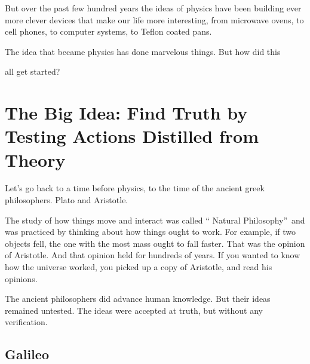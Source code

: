 \documentclass{article}
\begin{document}
But over the past few hundred years the ideas of physics have been building
ever more clever devices that make our life more interesting, from microwave
ovens, to cell phones, to computer systems, to Teflon coated pans.


The idea that became physics has done marvelous things. But how did this

all get started?

\section{The Big Idea: Find Truth by Testing Actions Distilled from Theory}

Let's go back to a time before physics, to the time of the ancient greek
philosophers. Plato and Aristotle.

The study of how things move and interact was called \textquotedblleft
Natural Philosophy\textquotedblright\ and was practiced by thinking about
how things ought to work. For example, if two objects fell, the one with the
most mass ought to fall faster. That was the opinion of Aristotle. And that
opinion held for hundreds of years. If you wanted to know how the universe
worked, you picked up a copy of Aristotle, and read his opinions.


The ancient philosophers did advance human knowledge. But their ideas
remained untested. The ideas were accepted at truth, but without any
verification.

\subsection{Galileo}
\end{document}
